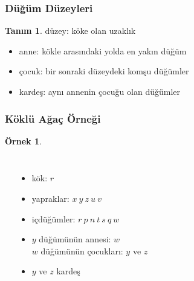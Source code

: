 \documentclass[dvipsnames]{beamer}
\theoremstyle{definition}
\newtheorem{tanim}[theorem]{Tanım}
\theoremstyle{example}
\newtheorem{ornek}[theorem]{Örnek}
\theoremstyle{plain}
\begin{document}
\begin{frame}
  \frametitle{Düğüm Düzeyleri}

  \begin{tanim}
    \alert{düzey}: köke olan uzaklık
  \end{tanim}

  \pause
  \begin{itemize}
    \item \alert{anne}: kökle arasındaki yolda en yakın düğüm
    \item \alert{çocuk}: bir sonraki düzeydeki komşu düğümler
    \item \alert{kardeş}: aynı annenin çocuğu olan düğümler
  \end{itemize}
\end{frame}

\begin{frame}
  \frametitle{Köklü Ağaç Örneği}

  \begin{ornek}
    \begin{columns}
      \begin{center}
      \end{center}

      \pause
      \begin{itemize}
        \item kök: $r$
        \item yapraklar: $x ~ y ~ z ~ u ~ v$
        \item içdüğümler: $r ~ p ~ n ~ t ~ s ~ q ~ w$
        \item $y$ düğümünün annesi: $w$\\
          $w$ düğümünün çocukları: $y$ ve $z$\\
	\item $y$ ve $z$ kardeş
      \end{itemize}
    \end{columns}
  \end{ornek}
\end{frame}
\end{document}

